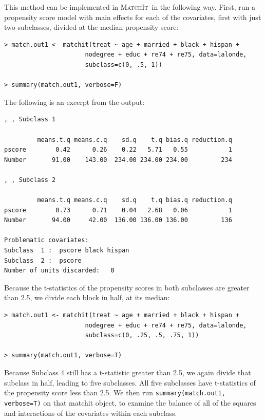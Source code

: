 \documentclass[oneside,letterpaper,titlepage]{article}
\newcommand{\MatchIt}{\textsc{MatchIt}}
\begin{document}
This method can be implemented in \MatchIt\ in the following way.
First, run a propensity score model with main effects for each of the
covariates, first with just two subclasses, divided at the median
propensity score:

\begin{verbatim}
> match.out1 <- matchit(treat ~ age + married + black + hispan +
                      nodegree + educ + re74 + re75, data=lalonde,                      
                      subclass=c(0, .5, 1))

> summary(match.out1, verbose=F)
\end{verbatim}

The following is an excerpt from the output:

\begin{verbatim}
, , Subclass 1

         means.t.q means.c.q    sd.q    t.q bias.q reduction.q
pscore        0.42      0.26    0.22   5.71   0.55           1
Number       91.00    143.00  234.00 234.00 234.00         234

, , Subclass 2

         means.t.q means.c.q    sd.q    t.q bias.q reduction.q
pscore        0.73      0.71    0.04   2.68   0.06           1
Number       94.00     42.00  136.00 136.00 136.00         136

Problematic covariates:
Subclass  1 :  pscore black hispan
Subclass  2 :  pscore
Number of units discarded:   0

\end{verbatim}

Because the t-statistics of the propensity scores in both subclasses
are greater than 2.5, we divide each block in half, at its median:

\begin{verbatim}
> match.out1 <- matchit(treat ~ age + married + black + hispan +
                      nodegree + educ + re74 + re75, data=lalonde,                      
                      subclass=c(0, .25, .5, .75, 1))

> summary(match.out1, verbose=T)
\end{verbatim}

Because Subclass 4 still has a t-statistic greater than 2.5, we again
divide that subclass in half, leading to five subclasses.  All five
subclasses have t-statistics of the propensity score less than 2.5.
We then run {\tt summary(match.out1, verbose=T)} on that matchit
object, to examine the balance of all of the squares and interactions
of the covariates within each subclass.
\end{document}

